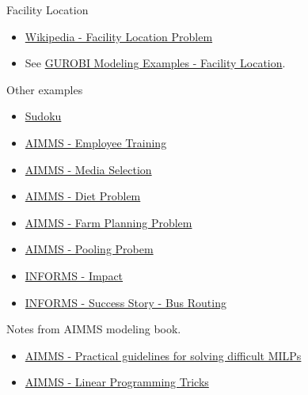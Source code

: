 {\begin{resource}
Facility Location
\begin{itemize}
\item \href{https://en.wikipedia.org/wiki/Facility_location_problem}{Wikipedia - Facility Location Problem}
\item See \href{https://github.com/Gurobi/modeling-examples/tree/master/facility_location}{GUROBI Modeling Examples - Facility Location}.
\end{itemize}


{Other examples}
\begin{itemize}
\item \href{https://www.juliaopt.org/notebooks/JuMP-Sudoku.html}{Sudoku}
\item \href{https://download.aimms.com/aimms/download/manuals/AIMMS3OM_EmployeeTraining.pdf}{AIMMS - Employee Training}

\item \href{https://download.aimms.com/aimms/download/manuals/AIMMS3OM_MediaSelection.pdf}{AIMMS - Media Selection}

\item \href{https://download.aimms.com/aimms/download/manuals/AIMMS3OM_Diet.pdf}{AIMMS - Diet Problem}

\item \href{https://download.aimms.com/aimms/download/manuals/AIMMS3OM_FarmPlanning.pdf}{AIMMS - Farm Planning Problem}

\item \href{https://download.aimms.com/aimms/download/manuals/AIMMS3OM_Pooling.pdf}{AIMMS - Pooling Probem}

\item \href{https://www.informs.org/Impact}{INFORMS - Impact}
\item \href{https://www.informs.org/Impact/O.R.-Analytics-Success-Stories/Optimized-school-bus-routing-helps-school-districts-design-better-policies}{INFORMS - Success Story - Bus Routing}
\end{itemize}

{Notes from AIMMS modeling book.}
\begin{itemize}

\item \href{http://inside.mines.edu/~anewman/MIP_practice120212.pdf}{AIMMS - Practical guidelines for solving difficult MILPs}

\item \href{https://download.aimms.com/aimms/download/manuals/AIMMS3OM_LinearProgrammingTricks.pdf}{AIMMS - Linear Programming Tricks}



\end{itemize}
\end{resource}}
